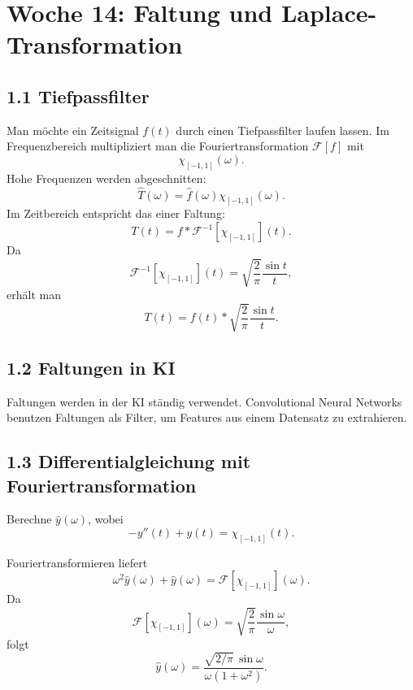 \documentclass[11pt,a4paper]{article}
\begin{document}
\section{Woche 14: Faltung und Laplace-Transformation}

\subsection{1.1 Tiefpassfilter}
Man möchte ein Zeitsignal $f(t)$ durch einen Tiefpassfilter laufen lassen. Im Frequenzbereich multipliziert man die Fouriertransformation $\mathcal F[f]$ mit
\[
\chi_{[-1,1]}(\omega).
\]
Hohe Frequenzen werden abgeschnitten:
\[
\widehat T(\omega)=\widehat f(\omega)\chi_{[-1,1]}(\omega).
\]
Im Zeitbereich entspricht das einer Faltung:
\[
T(t)=f*\mathcal F^{-1}[\chi_{[-1,1]}](t).
\]
Da
\[
\mathcal F^{-1}[\chi_{[-1,1]}](t)=\sqrt{\frac2\pi}\frac{\sin t}{t},
\]
erhält man
\[
T(t)=f(t)*\sqrt{\frac2\pi}\frac{\sin t}{t}.
\]

\begin{center}
\end{center}

\subsection{1.2 Faltungen in KI}
Faltungen werden in der KI ständig verwendet. Convolutional Neural Networks benutzen Faltungen als Filter, um Features aus einem Datensatz zu extrahieren.

\subsection{1.3 Differentialgleichung mit Fouriertransformation}
\begin{fragebox}
Berechne $\widehat y(\omega)$, wobei
\[
-y''(t)+y(t)=\chi_{[-1,1]}(t).
\]
\end{fragebox}
\begin{antwortbox}
Fouriertransformieren liefert
\[
\omega^2\widehat y(\omega)+\widehat y(\omega)=\mathcal F[\chi_{[-1,1]}](\omega).
\]
Da
\[
\mathcal F[\chi_{[-1,1]}](\omega)=\sqrt{\frac2\pi}\frac{\sin\omega}{\omega},
\]
folgt
\[
\widehat y(\omega)=\frac{\sqrt{2/\pi}\,\sin\omega}{\omega(1+
\omega^2)}.
\]
\end{antwortbox}
\end{document}
